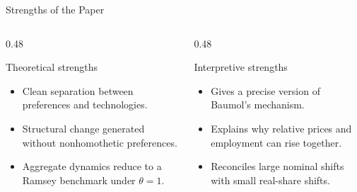 \begin{frame}{Strengths of the Paper}
  \small
  \begin{columns}[T,onlytextwidth]
    \begin{column}{0.48\textwidth}
      \begin{block}{Theoretical strengths}
        \begin{itemize}
          \item Clean separation between preferences and technologies.
          \item Structural change generated without nonhomothetic preferences.
          \item Aggregate dynamics reduce to a Ramsey benchmark under $\theta=1$.
        \end{itemize}
      \end{block}
    \end{column}
    \begin{column}{0.48\textwidth}
      \begin{alertblock}{Interpretive strengths}
        \begin{itemize}
          \item Gives a precise version of Baumol's mechanism.
          \item Explains why relative prices and employment can rise together.
          \item Reconciles large nominal shifts with small real-share shifts.
        \end{itemize}
      \end{alertblock}
    \end{column}
  \end{columns}
\end{frame}

